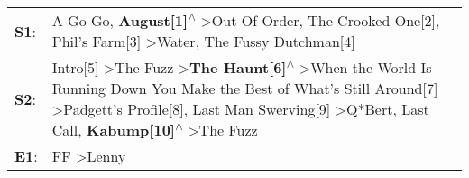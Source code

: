 \begin{supertabular}{p{0.03\textwidth}p{0.92\textwidth}}
 \textbf{S1}:  &                                                                                                                                                                                                                                                   A Go Go\textsuperscript{}, \enspace \textbf{August[1]\textsuperscript{$\wedge$}} \textgreater \enspace Out Of Order\textsuperscript{}, \enspace The Crooked One[2]\textsuperscript{}, \enspace Phil's Farm[3]\textsuperscript{} \textgreater \enspace Water\textsuperscript{}, \enspace The Fussy Dutchman[4]\textsuperscript{}  \enspace  \\
 \textbf{S2}:  &  Intro[5]\textsuperscript{} \textgreater \enspace The Fuzz\textsuperscript{} \textgreater \enspace \textbf{The Haunt[6]\textsuperscript{$\wedge$}} \textgreater \enspace When the World Is Running Down You Make the Best of What's Still Around[7]\textsuperscript{} \textgreater \enspace Padgett's Profile[8]\textsuperscript{}, \enspace Last Man Swerving[9]\textsuperscript{} \textgreater \enspace Q*Bert\textsuperscript{}, \enspace Last Call\textsuperscript{}, \enspace \textbf{Kabump[10]\textsuperscript{$\wedge$}} \textgreater \enspace The Fuzz\textsuperscript{}  \enspace  \\
 \textbf{E1}:  &                                                                                                                                                                                                                                                                                                                                                                                                                                                                                                                FF\textsuperscript{} \textgreater \enspace Lenny\textsuperscript{}  \enspace  \\
\end{supertabular}
